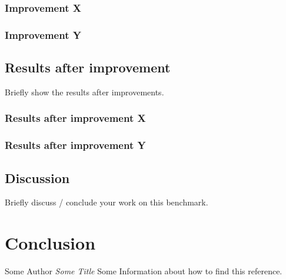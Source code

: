\documentclass[twocolumn]{article}
\begin{document}
\subsubsection{Improvement X}
\subsubsection{Improvement Y}
\subsection{Results after improvement}
Briefly show the results after improvements.
\subsubsection{Results after improvement X}
\subsubsection{Results after improvement Y}
\subsection{Discussion}
Briefly discuss / conclude your work on this benchmark.

\section{Conclusion}

\begin{thebibliography}{}
Some Author
\textit{Some Title}
Some Information about how to find this reference.
\end{thebibliography}
\end{document}
